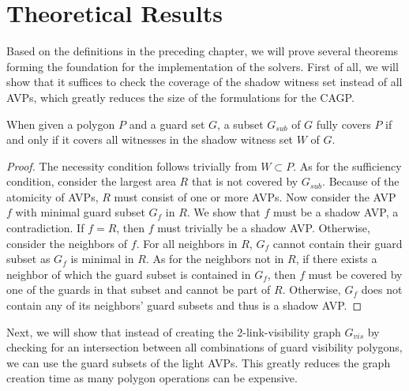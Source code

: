 \chapter{Theoretical Results}\label{ch:theoretical_results}
Based on the definitions in the preceding chapter, we will prove several theorems forming the foundation for the implementation of the solvers. First of all, we will show that it suffices to check the coverage of the shadow witness set instead of all AVPs, which greatly reduces the size of the formulations for the CAGP.

\begin{theorem}\label{thm:shadow_coverage}
When given a polygon $P$ and a guard set $G$, a subset $G_{sub}$ of $G$ fully covers $P$ if and only if it covers all witnesses in the shadow witness set $W$ of $G$. 
\end{theorem}
\begin{proof}
The necessity condition follows trivially from $W\subset P$. As for the sufficiency condition, consider the largest area $R$ that is not covered by $G_{sub}$. Because of the atomicity of AVPs, $R$ must consist of one or more AVPs. Now consider the AVP $f$ with minimal guard subset $G_{f}$ in $R$. We show that $f$ must be a shadow AVP, a contradiction. If $f = R$, then $f$ must trivially be a shadow AVP. Otherwise, consider the neighbors of $f$. For all neighbors in $R$, $G_{f}$ cannot contain their guard subset as $G_{f}$ is minimal in $R$. As for the neighbors not in $R$, if there exists a neighbor of which the guard subset is contained in $G_{f}$, then $f$ must be covered by one of the guards in that subset and cannot be part of $R$. Otherwise, $G_{f}$ does not contain any of its neighbors' guard subsets and thus is a shadow AVP.
\end{proof}

Next, we will show that instead of creating the 2-link-visibility graph $G_{vis}$ by checking for an intersection between all combinations of guard visibility polygons, we can use the guard subsets of the light AVPs. This greatly reduces the graph creation time as many polygon operations can be expensive.

